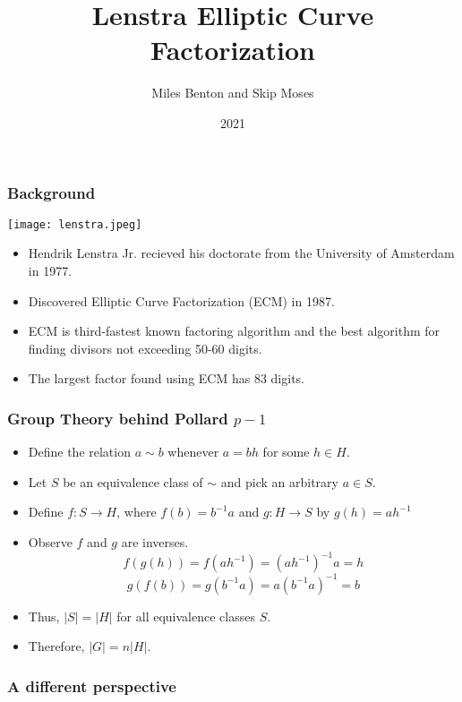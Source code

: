 \documentclass{beamer}
\title{Lenstra Elliptic Curve Factorization}
\author{Miles Benton and Skip Moses}
\institute{MATH 317}
\date{2021}
\begin{document}
\frame{\titlepage}


\begin{frame}
\frametitle{Background}

\center
\texttt{[image: lenstra.jpeg]}

\begin{itemize}[<+->]
\item Hendrik Lenstra Jr. recieved his doctorate from the University of Amsterdam in 1977.

\item Discovered Elliptic Curve Factorization (ECM) in 1987.

\item ECM is third-fastest known factoring algorithm and the best algorithm for finding divisors not exceeding 50-60 digits.

\item The largest factor found using ECM has 83 digits.
\end{itemize}
\end{frame}

\begin{frame}
\frametitle{Group Theory behind Pollard $p-1$}



\begin{itemize}
\item<4-> Define the relation $a \sim b$ whenever $a = bh$ for some $h \in H$.
\item<5-> Let $S$ be an equivalence class of $\sim$ and pick an arbitrary $a \in S$.
\item<6-> Define $f: S \rightarrow H$, where $f(b) = b^{-1}a$ and $g:H \rightarrow S$ by $g(h) = ah^{-1}$
\item<7-> Observe $f$ and $g$ are inverses.
$$f(g(h)) = f(ah^{-1}) = (ah^{-1})^{-1}a = h$$
$$g(f(b)) = g(b^{-1}a) = a(b^{-1}a)^{-1} = b$$
\item<7-> Thus, $\vert S \vert = \vert H \vert$ for all equivalence classes $S$.
\item<8-> Therefore, $\vert G \vert = n \vert H \vert$.
\end{itemize}
\end{frame}

\begin{frame}
\frametitle{A different perspective}
\end{frame}
\end{document}
